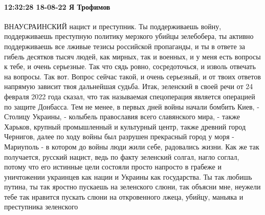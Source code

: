  
 
 
 
 

\paragraph{12:32:28 18-08-22 Я Трофимов}

ВНАУСРАИНСКИЙ нацист и преступник. Ты поддерживаешь войну, поддерживаешь
преступную политику мерзкого убийцы зелебобера, ты активно поддерживаешь все
лживые тезисы российской пропаганды, и ты в ответе за гибель десятков тысяч
людей, как мирных, так и военных, и у меня есть вопросы к тебе, и очень
серьезные. Так что сядь ровно, сосредоточься, и изволь отвечать на вопросы. Так
вот. Вопрос сейчас такой, и очень серьезный, и от твоих ответов напрямую
зависит твоя дальнейшая судьба.  Итак, зеленский в своей речи от 24 февраля
2022 года сказал, что так называемая спецоперация является операцией по защите
Донбасса. Тем не менее, в первых дней войны начали бомбить Киев, - Столицу
Украины, - колыбель православия всего славянского мира, - также Харьков,
крупный промышленный и культурный центр, также древний город Чернигов, далее по
ходу войны был разрушен прекрасный город у моря - Мариуполь - в котором до
войны люди жили себе, радовались жизни. Как же так получается, русский нацист,
ведь по факту зеленский солгал, нагло соглал, потому что его истинные цели
состояли просто напросто в грабеже и уничтожении украинцев как нации и Украины
как государства. Ты так любишь путина, ты так яростно пускаешь на зеленского
слюни, так объясни мне, неужели тебе так нравится пускать слюни на откровенного
лжеца, убийцу, маньяка и преступника зеленского

